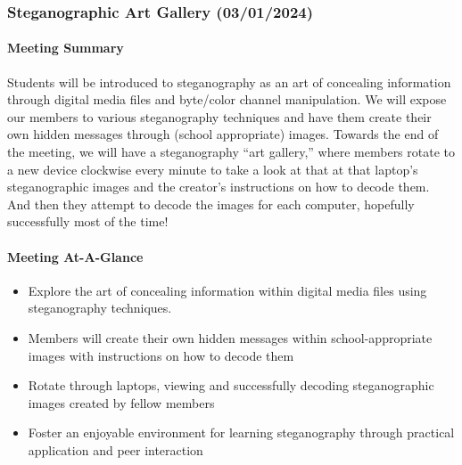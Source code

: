 \documentclass[
  letterpaper,
  DIV=11,
  numbers=noendperiod]{scrartcl}
\let\oldparagraph\paragraph
\renewcommand{\paragraph}[1]{\oldparagraph{#1}\mbox{}}
\providecommand{\tightlist}{%
  \setlength{\itemsep}{0pt}\setlength{\parskip}{0pt}}\usepackage{longtable,booktabs,array}
\begin{document}
\hypertarget{steganographic-art-gallery-03012024}{%
\subsubsection{Steganographic Art Gallery
(03/01/2024)}\label{steganographic-art-gallery-03012024}}

\hypertarget{meeting-summary-16}{%
\paragraph{Meeting Summary}\label{meeting-summary-16}}

Students will be introduced to steganography as an art of concealing
information through digital media files and byte/color channel
manipulation. We will expose our members to various steganography
techniques and have them create their own hidden messages through
(school appropriate) images. Towards the end of the meeting, we will
have a steganography ``art gallery,'' where members rotate to a new
device clockwise every minute to take a look at that at that laptop's
steganographic images and the creator's instructions on how to decode
them. And then they attempt to decode the images for each computer,
hopefully successfully most of the time!

\hypertarget{meeting-at-a-glance-16}{%
\paragraph{Meeting At-A-Glance}\label{meeting-at-a-glance-16}}

\begin{itemize}
\tightlist
\item
  Explore the art of concealing information within digital media files
  using steganography techniques.
\item
  Members will create their own hidden messages within
  school-appropriate images with instructions on how to decode them
\item
  Rotate through laptops, viewing and successfully decoding
  steganographic images created by fellow members
\item
  Foster an enjoyable environment for learning steganography through
  practical application and peer interaction
\end{itemize}
\end{document}
